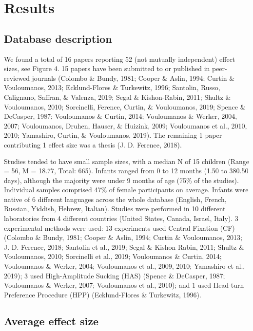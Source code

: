 \documentclass[man]{apa6}
\begin{document}
\section{Results}\label{results}

\subsection{Database description}\label{database-description}

We found a total of 16 papers reporting 52 (not mutually independent)
effect sizes, see Figure 4. 15 papers have been submitted to or
published in peer-reviewed journals (Colombo \& Bundy, 1981; Cooper \&
Aslin, 1994; Curtin \& Vouloumanos, 2013; Ecklund-Flores \& Turkewitz,
1996; Santolin, Russo, Calignano, Saffran, \& Valenza, 2019; Segal \&
Kishon-Rabin, 2011; Shultz \& Vouloumanos, 2010; Sorcinelli, Ference,
Curtin, \& Vouloumanos, 2019; Spence \& DeCasper, 1987; Vouloumanos \&
Curtin, 2014; Vouloumanos \& Werker, 2004, 2007; Vouloumanos, Druhen,
Hauser, \& Huizink, 2009; Vouloumanos et al., 2010, 2010; Yamashiro,
Curtin, \& Vouloumanos, 2019). The remaining 1 paper contributing 1
effect size was a thesis (J. D. Ference, 2018).

Studies tended to have small sample sizes, with a median N of 15
children (Range = 56, M = 18.77, Total: 665). Infants ranged from 0 to
12 months (1.50 to 380.50 days), although the majority were under 9
months of age (75\% of the studies). Individual samples comprised 47\%
of female participants on average. Infants were native of 6 different
languages across the whole database (English, French, Russian, Yiddish,
Hebrew, Italian). Studies were performed in 10 different laboratories
from 4 different countries (United States, Canada, Israel, Italy). 3
experimental methods were used: 13 experiments used Central Fixation
(CF) (Colombo \& Bundy, 1981; Cooper \& Aslin, 1994; Curtin \&
Vouloumanos, 2013; J. D. Ference, 2018; Santolin et al., 2019; Segal \&
Kishon-Rabin, 2011; Shultz \& Vouloumanos, 2010; Sorcinelli et al.,
2019; Vouloumanos \& Curtin, 2014; Vouloumanos \& Werker, 2004;
Vouloumanos et al., 2009, 2010; Yamashiro et al., 2019); 3 used
High-Amplitude Sucking (HAS) (Spence \& DeCasper, 1987; Vouloumanos \&
Werker, 2007; Vouloumanos et al., 2010); and 1 used Head-turn Preference
Procedure (HPP) (Ecklund-Flores \& Turkewitz, 1996).

\subsection{Average effect size}\label{average-effect-size}
\end{document}
